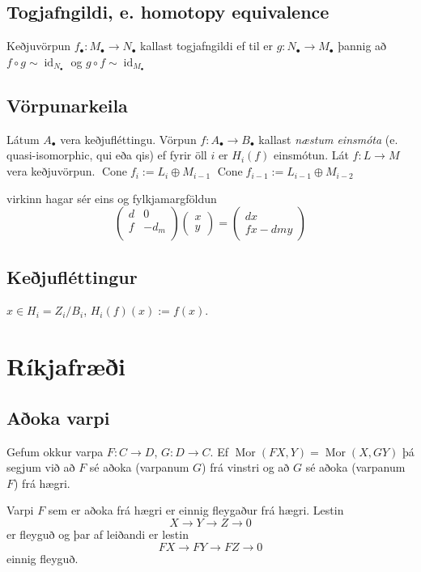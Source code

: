 \documentclass[a4paper, 14pt]{article}
\DeclareMathOperator{\Mor}{Mor}
\DeclareMathOperator{\id}{id}
\DeclareMathOperator{\Cone}{Cone}
\begin{document}
\subsection{Togjafngildi, e. homotopy equivalence}
Keðjuvörpun $f_\bullet: M_\bullet \to N_\bullet$ kallast togjafngildi ef til er $g: N_\bullet \to M_\bullet $ þannig að
$f \circ g \sim \id_{N_\bullet}$ og $g \circ f \sim \id_{M_\bullet}$ 


\subsection{Vörpunarkeila}
Látum $A_\bullet$ vera keðjufléttingu. Vörpun $f: A_\bullet \to B_\bullet$ kallast \emph{næstum einsmóta}
(e. quasi-isomorphic, qui eða qis) ef fyrir öll $i$ er $H_i(f)$ einsmótun.
Lát $f: L \to M$ vera keðjuvörpun. $\Cone f_i := L_i \oplus M_{i-1}$
$\Cone f_{i-1} := L_{i-1} \oplus M_{i-2}$

virkinn hagar sér eins og fylkjamargföldun
\[
\begin{pmatrix}
d & 0 \\
f & -d_m \\
\end{pmatrix}
\begin{pmatrix}
x \\
y 
\end{pmatrix}
=
\begin{pmatrix}
dx \\
fx - dmy
\end{pmatrix}

\]

\subsection{Keðjufléttingur}
$x \in H_i = Z_i/B_i$,
$H_i(f)(x) := f(x)$.

\section{Ríkjafræði}

\subsection{Aðoka varpi}
Gefum okkur varpa $F: C \rightarrow D$, $G: D \rightarrow C$.
Ef $\Mor(FX, Y) = \Mor(X, GY)$ þá segjum við að $F$ sé aðoka (varpanum $G$)
frá vinstri og að $G$ sé aðoka (varpanum $F$) frá hægri.

Varpi $F$ sem er aðoka frá hægri er einnig fleygaður frá hægri. 
Lestin
$$
    X \rightarrow Y \rightarrow Z \rightarrow 0
$$
er fleyguð og þar af leiðandi er lestin
$$
    FX \to FY \to FZ \to 0
$$
einnig fleyguð.
\end{document}
